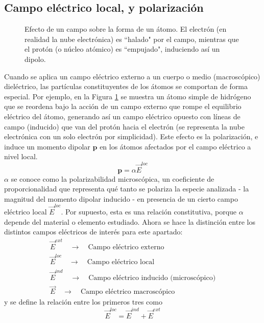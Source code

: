 \documentclass[12pt, oneside, numbers, spanish]{ezthesis}
\numberwithin{equation}{section}
\begin{document}
\subsection{Campo eléctrico local, y polarización}\label{subsec:Local_Field}
\begin{figure}[H]
\centering

\caption{Efecto de un campo sobre la forma de un átomo. El electrón (en realidad la nube electrónica) es ``halado" por el campo, mientras que el protón (o núcleo atómico) es ``empujado", induciendo así un dipolo.}
\label{fig:Polarization}
\end{figure}
Cuando se aplica un campo eléctrico externo a un cuerpo o medio (macroscópico) dieléctrico, las partículas constituyentes de los átomos se comportan de forma especial. Por ejemplo, en la Figura \ref{fig:Polarization} se muestra un átomo simple de hidrógeno que se reordena bajo la acción de un campo externo que rompe el equilibrio eléctrico del átomo, generando así un campo eléctrico opuesto con líneas de campo (inducido) que van del protón hacia el electrón (se representa la nube electrónica con un solo electrón por simplicidad). Este efecto es la polarización, e induce un momento dipolar $\mathbf{p}$ en los átomos afectados por el campo eléctrico a nivel local.
\begin{equation}
\mathbf{p} = \alpha\vec{E}^{loc}
\end{equation}
$\alpha$ se conoce como la polarizabilidad microscópica, un coeficiente de proporcionalidad que representa qué tanto se polariza la especie analizada - la magnitud del momento dipolar inducido - en presencia de un cierto campo eléctrico local $\vec{E}^{loc}$. Por supuesto, esta es una relación constitutiva, porque $\alpha$ depende del material o elemento estudiado. Ahora se hace la distinción entre los distintos campos eléctricos de interés para este apartado:
\begin{gather*}
\vec{E}^{ext} \quad \longrightarrow \quad \text{Campo eléctrico externo}\\
\vec{E}^{loc} \quad \longrightarrow \quad \text{Campo eléctrico local}\\
\vec{E}^{ind} \quad \longrightarrow \quad \text{Campo eléctrico inducido (microscópico)}\\
\vec{E} \quad \longrightarrow \quad \text{Campo eléctrico macroscópico}
\end{gather*}
y se define la relación entre los primeros tres como
\begin{equation}
\vec{E}^{loc} = \vec{E}^{ind} + \vec{E}^{ext}
\end{equation}
\end{document}
